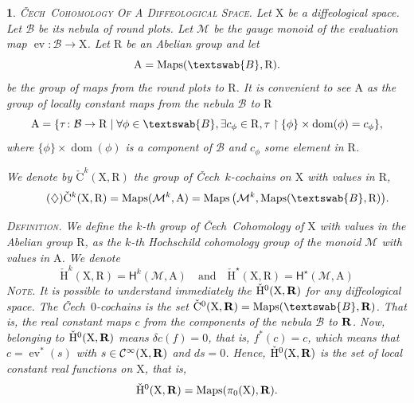 \documentclass[12pt,reqno]{amsart}
\theoremstyle{article}
\newtheorem{article}{}
\def\artlabel[#1]{\textsc{#1}.}
\def \A{\mathrm A}
\def \R{\mathrm R}
\def \X{\mathrm X}
\newcommand{\RR}{{\bf R}}
\newcommand{\cB}{{\mathcal B}}
\newcommand{\cM}{\mathcal{M}}
\newcommand{\fB}{\textswab{B}}
\newcommand{\sH}{\mathsf{H}}
\newcommand{\Cinfty}{{\mathcal C}^{\infty}}
\newcommand{\Cech}{\v{C}ech\ }
\DeclareMathOperator{\dom}{dom}
\DeclareMathOperator{\ev}{ev}
\DeclareMathOperator{\Maps}{Maps}
\newcommand{\vC}{\check{\mathrm{C}}}
\newcommand{\vH}{\check{\mathrm{H}}}
\begin{document}
  \begin{article}\artlabel[\Cech Cohomology Of A Diffeological Space]
    \label{Cech-Cohomology-Of-A-Diffeological-Space}
    Let $\X$ be a diffeological space.
    Let $\cB$ be its nebula of round plots.
    Let $\cM$ be the gauge monoid of the evaluation map $\ev \colon \cB \to \X$.
    Let $\R$ be an Abelian group and let
    $$
    \A = \Maps(\fB,\R).
    $$
    be the group of maps from the round plots to $\R$.
    It is convenient to see $\A$ as the group of locally constant maps from the nebula $\cB$ to $\R$
    \[
    \A = \{ \tau \colon \cB \to \R \mid \forall \phi \in \fB, \exists c_\phi \in \R, \tau \restriction \{\phi\} \times \dom(\phi) = c_\phi \},
    \]
    where $\{\phi\} \times \dom(\phi)$ is a component of $\cB$ and $c_\phi$ some element in $\R$.
    
    We denote by $\vC^k(\X,\R)$ the group of \Cech $k$-cochains on $\X$ with values in $\R$,
    \begin{equation}\tag{$\diamondsuit$}
      \vC^k(\X,\R) = \Maps(\cM^k, \A) = \Maps\big(\cM^k, \Maps(\fB,\R)\big).
    \end{equation}
    
    \textsc{Definition.} \textit{We define the $k$-th group of \Cech Cohomology of $\X$ with values in the Abelian group $\R$,
    as the $k$-th Hochschild cohomology group of the monoid $\cM$ with values in $\A$.
    We denote
    \begin{equation}\tag{$\heartsuit$}
      \vH^k(\X,\R) = \sH^k(\cM,\A)
      \quad \text{and} \quad
      \vH^\star(\X,\R) = \sH^\star(\cM,\A)
    \end{equation}
    }
    \textsc{Note.} It is possible to understand immediately the $\vH^0(\X,\RR)$ for any diffeological space.
    The \Cech $0$-cochains is the set $\vC^0(\X,\RR) = \Maps(\fB,\RR)$.
    That is,
    the real constant maps $c$ from the components of the nebula $\cB$ to $\RR$.
    Now,
    belonging to $\vH^0(\X,\RR)$ means $\delta c(f)=0$,
    that is,
    $f^*(c) = c$,
    which means that $c = \ev^*(s)$ with $s \in \Cinfty(\X,\RR)$ and $ds=0$.
    Hence,
    $\vH^0(\X,\RR)$ is the set of local constant real functions on $\X$,
    that is,
    \[
    \vH^0(\X,\RR) = \Maps(\pi_0(\X),\RR).
    \]
  \end{article}
  
\end{document}
